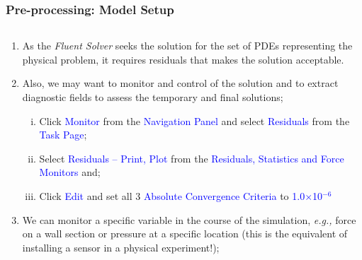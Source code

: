 \documentclass[10pt,compress, unknownkeysallowed]{beamer}
\newcommand{\blue}{\textcolor{blue}}
\newcommand{\eg}{{\it e.g., }}
\begin{document}
\begin{frame}
  \frametitle{Pre-processing: Model Setup}
    \begin{columns}
        \begin{column}[l]{0.5\linewidth}
           \begin{enumerate}\scriptsize\setcounter{enumi}{17}
               \item<1-> As the {\it Fluent Solver} seeks the solution for the set of PDEs representing the physical problem, it requires residuals that makes the solution acceptable.
               \item<1-> Also, we may want to monitor and control of the solution and to extract diagnostic fields to assess the temporary and final solutions;  
                    \begin{enumerate}[i)]\scriptsize
                       \item<2-> Click \blue{Monitor} from the \blue{Navigation Panel} and select \blue{Residuals} from the \blue{Task Page};
                       \item<2-> Select \blue{Residuals -- Print, Plot} from the \blue{Residuals, Statistics and Force Monitors} and;
                       \item<2-> Click \blue{Edit} and set all 3 \blue{Absolute Convergence Criteria} to \blue{1.0$\times$10$^{-6}$}
                    \end{enumerate}
               \item<3-> We can monitor a specific variable in the course of the simulation, \eg force on a wall section or pressure at a specific location (this is the equivalent of installing a sensor in a physical experiment!);
           \end{enumerate}
           

\end{column}
\end{columns}
\end{frame}
\end{document}
